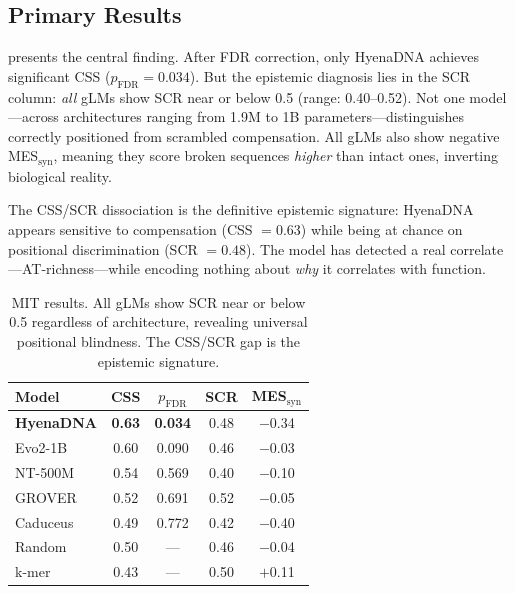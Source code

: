 \documentclass{article}
\begin{document}
\subsection{Primary Results}

 presents the central finding.
After FDR correction, only HyenaDNA achieves significant CSS
($p_{\text{FDR}}{=}0.034$).
But the epistemic diagnosis lies in the SCR column: \emph{all} gLMs show
SCR near or below 0.5 (range: 0.40--0.52).
Not one model---across architectures ranging from 1.9M to 1B
parameters---distinguishes correctly positioned from scrambled
compensation.
All gLMs also show negative MES$_\text{syn}$, meaning they score broken
sequences \emph{higher} than intact ones, inverting biological reality.

The CSS/SCR dissociation is the definitive epistemic signature:
HyenaDNA appears sensitive to compensation (CSS $= 0.63$) while being at
chance on positional discrimination (SCR $= 0.48$).
The model has detected a real correlate---AT-richness---while encoding
nothing about \emph{why} it correlates with function.

\begin{table}[t]
\caption{MIT results. All gLMs show SCR near or below 0.5 regardless
         of architecture, revealing universal positional blindness.
         The CSS/SCR gap is the epistemic signature.}
\label{tab:main_results}
\vskip 0.05in
\centering
\small
\begin{tabular}{@{}lcccc@{}}
\toprule
Model & CSS & $p_{\text{FDR}}$ & SCR & MES$_\text{syn}$ \\
\midrule
\textbf{HyenaDNA} & \textbf{0.63} & \textbf{0.034} & 0.48 & $-$0.34 \\
Evo2-1B           & 0.60          & 0.090          & 0.46 & $-$0.03 \\
NT-500M           & 0.54          & 0.569          & 0.40 & $-$0.10 \\
GROVER            & 0.52          & 0.691          & 0.52 & $-$0.05 \\
Caduceus          & 0.49          & 0.772          & 0.42 & $-$0.40 \\
\midrule
Random            & 0.50          & ---            & 0.46 & $-$0.04 \\
k-mer             & 0.43          & ---            & 0.50 & $+$0.11 \\
\bottomrule
\end{tabular}
\vskip -0.05in
\end{table}
\end{document}

